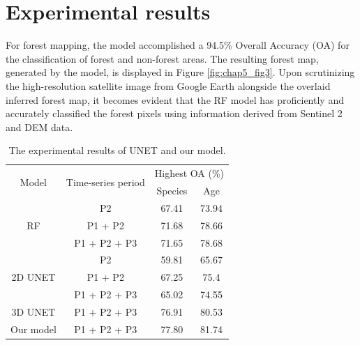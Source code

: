 \section{Experimental results} \label{chap5_result}
For forest mapping, the model accomplished a 94.5\% Overall Accuracy (OA) for the classification of forest and non-forest areas. The resulting forest map, generated by the model, is displayed in Figure \ref{fig:chap5_fig3}. Upon scrutinizing the high-resolution satellite image from Google Earth alongside the overlaid inferred forest map, it becomes evident that the RF model has proficiently and accurately classified the forest pixels using information derived from Sentinel 2 and DEM data. \par

\begin{table}[tbh!]
    \centering
    \caption{The experimental results of UNET and our model.}
    \begin{tabular}{cccc}
    \hline
        \multirow{2}{*}{Model} & \multirow{2}{*}{Time-series period} & \multicolumn{2}{c}{Highest OA (\%)} \\ \cline{3-4}
        ~ & ~ & Species & Age \\ \hline
        \multirow{3}{*}{RF} & P2 & 67.41 & 73.94 \\ 
        ~ & P1 + P2 & 71.68 & 78.66 \\ 
        ~ & P1 + P2 + P3 & 71.65 & 78.68 \\ \hline
        \multirow{3}{*}{2D UNET} & P2 & 59.81 & 65.67 \\ 
        ~ & P1 + P2 & 67.25 & 75.4 \\ 
        ~ & P1 + P2 + P3 & 65.02 & 74.55 \\ \hline
        3D UNET & P1 + P2 + P3 & 76.91 & 80.53 \\ 
        Our model & P1 + P2 + P3 & 77.80 & 81.74 \\ \hline
    \end{tabular}
    \label{tab:chap5_tab2}
\end{table}

